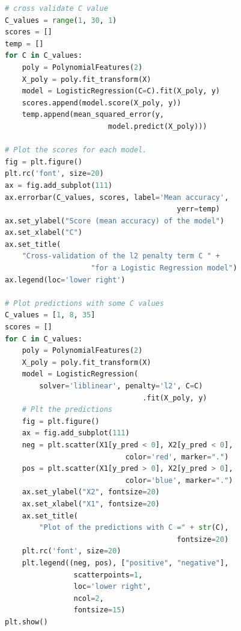 \documentclass[10pt]{article}
\begin{document}
\begin{lstlisting}[language=Python]
# cross validate C value
C_values = range(1, 30, 1)
scores = []
temp = []
for C in C_values:
    poly = PolynomialFeatures(2)
    X_poly = poly.fit_transform(X)
    model = LogisticRegression(C=C).fit(X_poly, y)
    scores.append(model.score(X_poly, y))
    temp.append(mean_squared_error(y,
                        model.predict(X_poly)))

# Plot the scores for each model.
fig = plt.figure()
plt.rc('font', size=20)
ax = fig.add_subplot(111)
ax.errorbar(C_values, scores, label='Mean accuracy',
                                        yerr=temp)
ax.set_ylabel("Score (mean accuracy) of the model")
ax.set_xlabel("C")
ax.set_title(
    "Cross-validation of the l2 penalty term C " +
                    "for a Logistic Regression model")
ax.legend(loc='lower right')

# Plot predictions with some C values
C_values = [1, 8, 35]
scores = []
for C in C_values:
    poly = PolynomialFeatures(2)
    X_poly = poly.fit_transform(X)
    model = LogisticRegression(
        solver='liblinear', penalty='l2', C=C)
                                .fit(X_poly, y)
    # Plt the predictions
    fig = plt.figure()
    ax = fig.add_subplot(111)
    neg = plt.scatter(X1[y_pred < 0], X2[y_pred < 0],
                            color='red', marker=".")
    pos = plt.scatter(X1[y_pred > 0], X2[y_pred > 0],
                            color='blue', marker=".")
    ax.set_ylabel("X2", fontsize=20)
    ax.set_xlabel("X1", fontsize=20)
    ax.set_title(
        "Plot of the predictions with C =" + str(C),
                                        fontsize=20)
    plt.rc('font', size=20)
    plt.legend((neg, pos), ["positive", "negative"],
                scatterpoints=1,
                loc='lower right',
                ncol=2,
                fontsize=15)
plt.show()
\end{lstlisting}
\par
\end{document}
